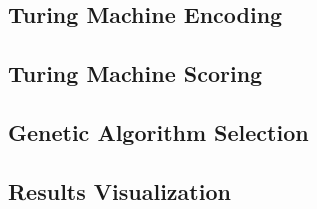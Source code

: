 \subsection{Turing Machine Encoding} 
\subsection{Turing Machine Scoring} 
\subsection{Genetic Algorithm Selection}
\subsection{Results Visualization}
